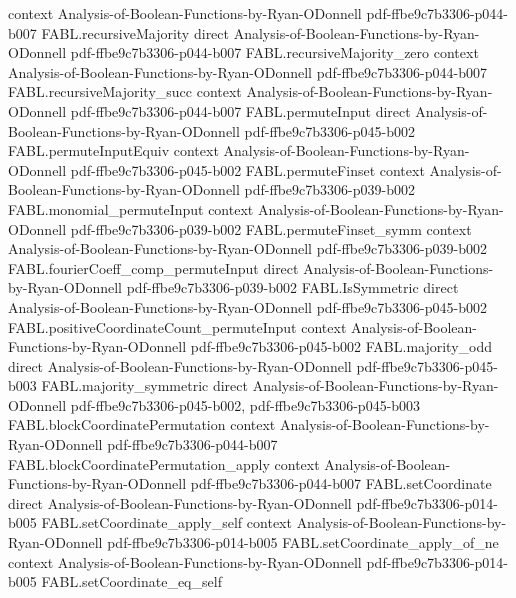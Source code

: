 \begin{theorem}
  {context}
  {Analysis-of-Boolean-Functions-by-Ryan-ODonnell}
  {pdf-ffbe9c7b3306-p044-b007}
\proofstep
  {FABL.recursiveMajority}
  {direct}
  {Analysis-of-Boolean-Functions-by-Ryan-ODonnell}
  {pdf-ffbe9c7b3306-p044-b007}
\proofstep
  {FABL.recursiveMajority_zero}
  {context}
  {Analysis-of-Boolean-Functions-by-Ryan-ODonnell}
  {pdf-ffbe9c7b3306-p044-b007}
\proofstep
  {FABL.recursiveMajority_succ}
  {context}
  {Analysis-of-Boolean-Functions-by-Ryan-ODonnell}
  {pdf-ffbe9c7b3306-p044-b007}
\proofstep
  {FABL.permuteInput}
  {direct}
  {Analysis-of-Boolean-Functions-by-Ryan-ODonnell}
  {pdf-ffbe9c7b3306-p045-b002}
\proofstep
  {FABL.permuteInputEquiv}
  {context}
  {Analysis-of-Boolean-Functions-by-Ryan-ODonnell}
  {pdf-ffbe9c7b3306-p045-b002}
\proofstep
  {FABL.permuteFinset}
  {context}
  {Analysis-of-Boolean-Functions-by-Ryan-ODonnell}
  {pdf-ffbe9c7b3306-p039-b002}
\proofstep
  {FABL.monomial_permuteInput}
  {context}
  {Analysis-of-Boolean-Functions-by-Ryan-ODonnell}
  {pdf-ffbe9c7b3306-p039-b002}
\proofstep
  {FABL.permuteFinset_symm}
  {context}
  {Analysis-of-Boolean-Functions-by-Ryan-ODonnell}
  {pdf-ffbe9c7b3306-p039-b002}
\proofstep
  {FABL.fourierCoeff_comp_permuteInput}
  {direct}
  {Analysis-of-Boolean-Functions-by-Ryan-ODonnell}
  {pdf-ffbe9c7b3306-p039-b002}
\proofstep
  {FABL.IsSymmetric}
  {direct}
  {Analysis-of-Boolean-Functions-by-Ryan-ODonnell}
  {pdf-ffbe9c7b3306-p045-b002}
\proofstep
  {FABL.positiveCoordinateCount_permuteInput}
  {context}
  {Analysis-of-Boolean-Functions-by-Ryan-ODonnell}
  {pdf-ffbe9c7b3306-p045-b002}
\proofstep
  {FABL.majority_odd}
  {direct}
  {Analysis-of-Boolean-Functions-by-Ryan-ODonnell}
  {pdf-ffbe9c7b3306-p045-b003}
\proofstep
  {FABL.majority_symmetric}
  {direct}
  {Analysis-of-Boolean-Functions-by-Ryan-ODonnell}
  {pdf-ffbe9c7b3306-p045-b002,
    pdf-ffbe9c7b3306-p045-b003}
\proofstep
  {FABL.blockCoordinatePermutation}
  {context}
  {Analysis-of-Boolean-Functions-by-Ryan-ODonnell}
  {pdf-ffbe9c7b3306-p044-b007}
\proofstep
  {FABL.blockCoordinatePermutation_apply}
  {context}
  {Analysis-of-Boolean-Functions-by-Ryan-ODonnell}
  {pdf-ffbe9c7b3306-p044-b007}
\proofstep
  {FABL.setCoordinate}
  {direct}
  {Analysis-of-Boolean-Functions-by-Ryan-ODonnell}
  {pdf-ffbe9c7b3306-p014-b005}
\proofstep
  {FABL.setCoordinate_apply_self}
  {context}
  {Analysis-of-Boolean-Functions-by-Ryan-ODonnell}
  {pdf-ffbe9c7b3306-p014-b005}
\proofstep
  {FABL.setCoordinate_apply_of_ne}
  {context}
  {Analysis-of-Boolean-Functions-by-Ryan-ODonnell}
  {pdf-ffbe9c7b3306-p014-b005}
\proofstep
  {FABL.setCoordinate_eq_self}

\end{theorem}
